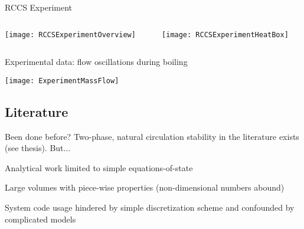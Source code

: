     \begin{frame}[c]{RCCS Experiment}
        \begin{columns}[c]
            \begin{column}{0.35\textwidth}
                \texttt{[image: RCCSExperimentOverview]}
            \end{column}
            \begin{column}{0.60\textwidth}
                \texttt{[image: RCCSExperimentHeatBox]}
            \end{column}
        \end{columns}
    \end{frame}
    
    
    
    \begin{frame}[c]{Experimental data: flow oscillations during boiling}
        \begin{center}
            \texttt{[image: ExperimentMassFlow]}
        \end{center}
    \end{frame}



    \subsection*{Literature}
    \begin{frame}{Been done before?}
        Two-phase, natural circulation stability in the literature exists (see thesis).
        \vspace{1em}
        But...
        \begin{Itemize}
            \item{Analytical work limited to simple equations-of-state}
            \item{Large volumes with piece-wise properties (non-dimensional numbers abound)}
            \item{System code usage hindered by simple discretization scheme and confounded by complicated models}
        \end{Itemize}
    \end{frame}
    
